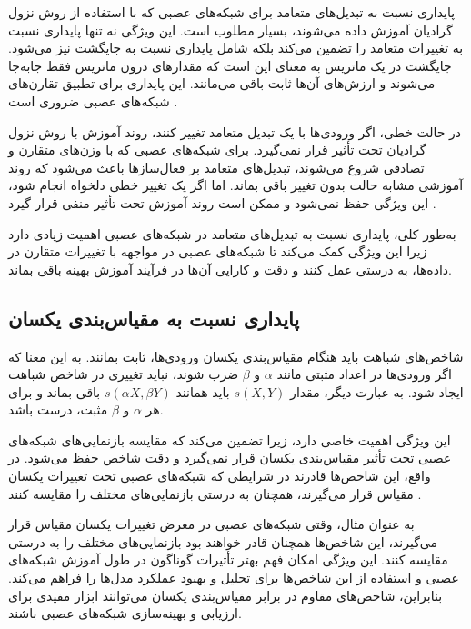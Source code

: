 پایداری نسبت به تبدیل‌های متعامد برای شبکه‌های عصبی که با استفاده از روش نزول گرادیان آموزش داده می‌شوند، بسیار مطلوب است. این ویژگی نه تنها پایداری نسبت به تغییرات متعامد را تضمین می‌کند بلکه شامل پایداری نسبت به جایگشت نیز می‌شود. جایگشت در یک ماتریس به معنای این است که مقدارهای درون ماتریس فقط جابه‌جا می‌شوند و ارزش‌های آن‌ها ثابت باقی می‌مانند. این پایداری برای تطبیق تقارن‌های شبکه‌های عصبی ضروری است
\cite{chen1993geometry, orhan2017skip}.

در حالت خطی، اگر ورودی‌ها با یک تبدیل متعامد تغییر کنند، روند آموزش با روش نزول گرادیان تحت تأثیر قرار نمی‌گیرد. برای شبکه‌های عصبی که با وزن‌های متقارن و تصادفی شروع می‌شوند، تبدیل‌های متعامد بر فعال‌سازها باعث می‌شود که روند آموزشی مشابه حالت بدون تغییر باقی بماند. اما اگر یک تغییر خطی دلخواه انجام شود، این ویژگی حفظ نمی‌شود و ممکن است روند آموزش تحت تأثیر منفی قرار گیرد
\cite{lecun1990second}.

به‌طور کلی، پایداری نسبت به تبدیل‌های متعامد در شبکه‌های عصبی اهمیت زیادی دارد زیرا این ویژگی کمک می‌کند تا شبکه‌های عصبی در مواجهه با تغییرات متقارن در داده‌ها، به درستی عمل کنند و دقت و کارایی آن‌ها در فرآیند آموزش بهینه باقی بماند.



\subsection{پایداری نسبت به مقیاس‌بندی یکسان}

شاخص‌های شباهت باید هنگام مقیاس‌بندی یکسان ورودی‌ها، ثابت بمانند. به این معنا که اگر ورودی‌ها در اعداد مثبتی مانند \(\alpha\) و \(\beta\) ضرب شوند، نباید تغییری در شاخص شباهت ایجاد شود. به عبارت دیگر، مقدار \( s(X, Y) \) باید همانند \( s(\alpha X, \beta Y) \) باقی بماند و برای هر \(\alpha\) و \(\beta\) مثبت، درست باشد.

این ویژگی اهمیت خاصی دارد، زیرا تضمین می‌کند که مقایسه بازنمایی‌های شبکه‌های عصبی تحت تأثیر مقیاس‌بندی یکسان قرار نمی‌گیرد و دقت شاخص حفظ می‌شود. در واقع، این شاخص‌ها قادرند در شرایطی که شبکه‌های عصبی تحت تغییرات یکسان مقیاس قرار می‌گیرند، همچنان به درستی بازنمایی‌های مختلف را مقایسه کنند
\cite{kornblith2019similarity}.

به عنوان مثال، وقتی شبکه‌های عصبی در معرض تغییرات یکسان مقیاس قرار می‌گیرند، این شاخص‌ها همچنان قادر خواهند بود بازنمایی‌های مختلف را به درستی مقایسه کنند. این ویژگی امکان فهم بهتر تأثیرات گوناگون در طول آموزش شبکه‌های عصبی و استفاده از این شاخص‌ها برای تحلیل و بهبود عملکرد مدل‌ها را فراهم می‌کند. بنابراین، شاخص‌های مقاوم در برابر مقیاس‌بندی یکسان می‌توانند ابزار مفیدی برای ارزیابی و بهینه‌سازی شبکه‌های عصبی باشند.



